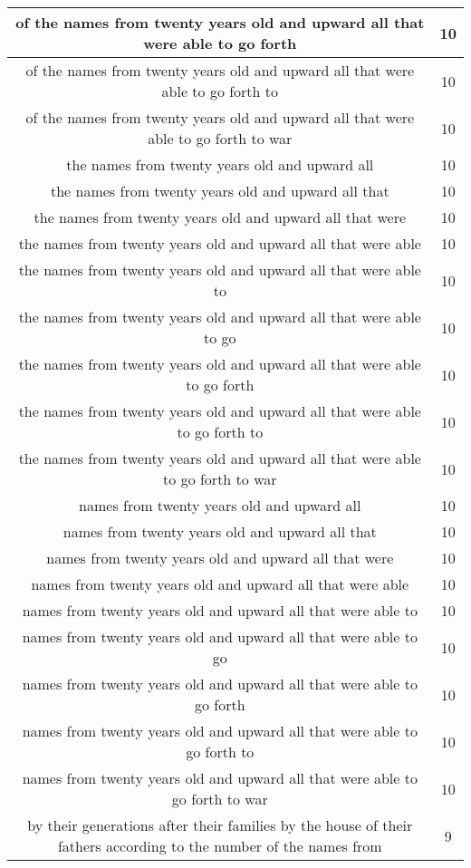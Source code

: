 \begin{center}
\begin{longtable}{|c|c|}
of the names from twenty years old and upward all that were able to go forth & 10\\ \hline 
of the names from twenty years old and upward all that were able to go forth to & 10\\ \hline 
of the names from twenty years old and upward all that were able to go forth to war & 10\\ \hline 
the names from twenty years old and upward all & 10\\ \hline 
the names from twenty years old and upward all that & 10\\ \hline 
the names from twenty years old and upward all that were & 10\\ \hline 
the names from twenty years old and upward all that were able & 10\\ \hline 
the names from twenty years old and upward all that were able to & 10\\ \hline 
the names from twenty years old and upward all that were able to go & 10\\ \hline 
the names from twenty years old and upward all that were able to go forth & 10\\ \hline 
the names from twenty years old and upward all that were able to go forth to & 10\\ \hline 
the names from twenty years old and upward all that were able to go forth to war & 10\\ \hline 
names from twenty years old and upward all & 10\\ \hline 
names from twenty years old and upward all that & 10\\ \hline 
names from twenty years old and upward all that were & 10\\ \hline 
names from twenty years old and upward all that were able & 10\\ \hline 
names from twenty years old and upward all that were able to & 10\\ \hline 
names from twenty years old and upward all that were able to go & 10\\ \hline 
names from twenty years old and upward all that were able to go forth & 10\\ \hline 
names from twenty years old and upward all that were able to go forth to & 10\\ \hline 
names from twenty years old and upward all that were able to go forth to war & 10\\ \hline 
by their generations after their families by the house of their fathers according to the number of the names from & 9\\ \hline 

\end{longtable}
\end{center}
